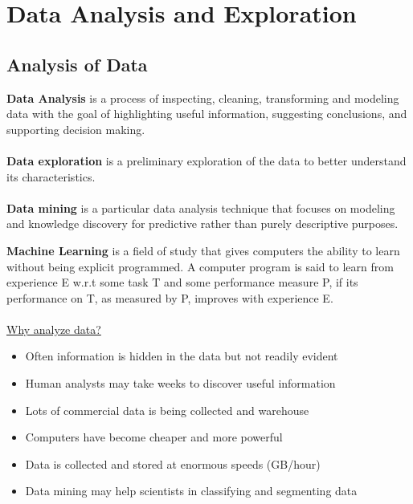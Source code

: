 \documentclass[10pt,a4paper]{article}
\newcommand{\nline}{\\~\\}
\begin{document}
\section{Data Analysis and Exploration}
\subsection{Analysis of Data}
\textbf{Data Analysis} is a process of inspecting, cleaning, transforming and modeling data with the goal of highlighting useful information, suggesting conclusions, and supporting decision making.
\nline
\textbf{Data exploration} is a preliminary exploration of the data to better understand its characteristics.
\nline
\textbf{Data mining} is a particular data analysis technique that focuses on modeling and knowledge discovery for predictive rather than purely descriptive purposes.

\textbf{Machine Learning} is a field of study that gives computers the ability to learn without being explicit programmed. A computer program is said to learn from experience E w.r.t some task T and some performance measure P, if its performance on T, as measured by P, improves with experience E.
\nline
\uline{Why analyze data?}
\begin{itemize}
	\item Often information is hidden in the data but not readily evident
	\item Human analysts may take weeks to discover useful information
	\item Lots of commercial data is being collected and warehouse
	\item Computers have become cheaper and more powerful
	\item Data is collected and stored at enormous speeds (GB/hour)
	\item Data mining may help scientists in classifying and segmenting data
\end{itemize}
\end{document}
